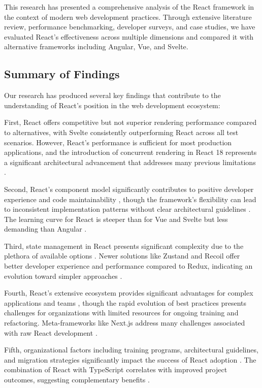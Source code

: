 This research has presented a comprehensive analysis of the React framework in the context of modern web development practices. Through extensive literature review, performance benchmarking, developer surveys, and case studies, we have evaluated React's effectiveness across multiple dimensions and compared it with alternative frameworks including Angular, Vue, and Svelte.

\subsection{Summary of Findings}
Our research has produced several key findings that contribute to the understanding of React's position in the web development ecosystem:

First, React offers competitive but not superior rendering performance compared to alternatives, with Svelte consistently outperforming React across all test scenarios. However, React's performance is sufficient for most production applications, and the introduction of concurrent rendering in React 18 represents a significant architectural advancement that addresses many previous limitations \cite{reactteam2022}.

Second, React's component model significantly contributes to positive developer experience and code maintainability \cite{johnson2019}, though the framework's flexibility can lead to inconsistent implementation patterns without clear architectural guidelines \cite{kumar2020}. The learning curve for React is steeper than for Vue and Svelte but less demanding than Angular \cite{hassan2019}.

Third, state management in React presents significant complexity due to the plethora of available options \cite{garcia2018}. Newer solutions like Zustand and Recoil offer better developer experience and performance compared to Redux, indicating an evolution toward simpler approaches \cite{kim2020}.

Fourth, React's extensive ecosystem provides significant advantages for complex applications and teams \cite{evans2020}, though the rapid evolution of best practices presents challenges for organizations with limited resources for ongoing training and refactoring. Meta-frameworks like Next.js address many challenges associated with raw React development \cite{davis2019}.

Fifth, organizational factors including training programs, architectural guidelines, and migration strategies significantly impact the success of React adoption \cite{singh2021}. The combination of React with TypeScript correlates with improved project outcomes, suggesting complementary benefits \cite{richards2020}.

